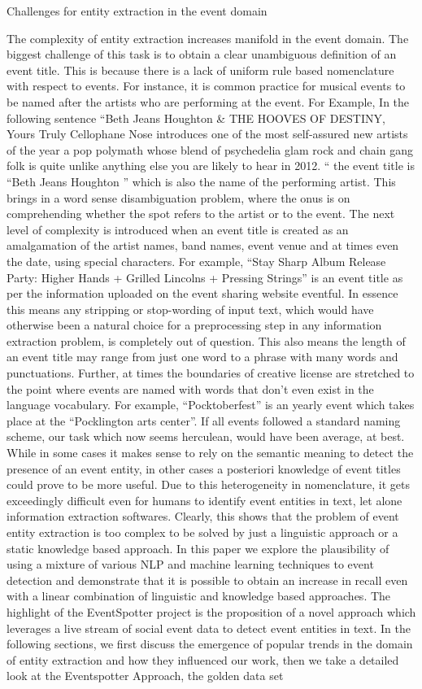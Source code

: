 \documentclass[a4paper,11pt]{report}
\begin{document}
Challenges for entity extraction in the event domain 

The complexity of entity extraction increases manifold in the event domain. The biggest challenge of this task is to obtain a clear unambiguous definition of an event title. This is because there is a lack of uniform rule based nomenclature with respect to events. For instance, it is common practice for musical events to be named after the artists who are performing at the event.  For Example, In the following sentence  “Beth Jeans Houghton & THE HOOVES OF DESTINY,  Yours Truly Cellophane Nose introduces one of the most self-assured new artists of the year a pop polymath whose blend of psychedelia glam rock and chain gang folk is quite unlike anything else you are likely to hear in 2012. “ the event title is “Beth Jeans Houghton ” which is also the name of the performing artist. This brings in a word sense disambiguation problem, where the onus is on comprehending whether the spot refers to the artist or to the event. The next level of complexity is introduced when an event title is created as an amalgamation of the artist names, band names, event venue and at times even the date, using special characters. For example, “Stay Sharp Album Release Party: Higher Hands + Grilled Lincolns + Pressing Strings” is an event title as per the information uploaded on the event sharing website eventful.  In essence this means any stripping or stop-wording of input text, which would have otherwise been a natural choice for a preprocessing step in any information extraction problem, is completely out of question. This also means the length of an event title may range from just one word to a phrase with many words and punctuations. Further, at times the boundaries of creative license are stretched to the point where events are named with words that don’t even exist in the language vocabulary. For example, “Pocktoberfest” is an yearly event which takes place at the “Pocklington arts center”. If all events followed a standard naming scheme, our task which now seems herculean, would have been average, at best. While in some cases it makes sense to rely on the semantic meaning to detect the presence of an event entity, in other cases a posteriori knowledge of event titles could prove to be more useful.  Due to this heterogeneity in nomenclature, it gets exceedingly difficult even for humans to identify event entities in text, let alone information extraction softwares.  Clearly, this shows that the problem of event entity extraction is too complex to be solved by just a linguistic approach or a static knowledge based approach. In this paper we explore the plausibility of using a mixture of various NLP and machine learning techniques to event detection and demonstrate that it is possible to obtain an increase in recall even with a linear combination of linguistic and knowledge based approaches. The highlight of the EventSpotter project is the proposition of a novel approach which leverages a live stream of social event data to detect event entities in text. In the following sections, we first discuss the emergence of popular trends in the domain of entity extraction and how they influenced our work, then we take a detailed look at the Eventspotter Approach, the golden data set 
\end{document}
